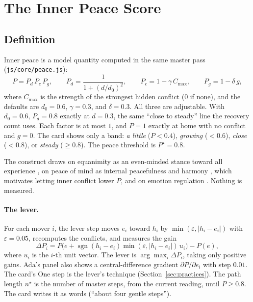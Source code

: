 \documentclass[10pt]{article}
\theoremstyle{definition}
\theoremstyle{remark}
\begin{document}
\section{The Inner Peace Score}
\label{sec:peace}
\subsection{Definition}
Inner peace is a model quantity computed in the same master pass (\texttt{js/core/peace.js}):
\begin{equation}
P = P_d\,P_c\,P_g,\qquad
P_d = \frac{1}{1+(d/d_0)^2},\qquad
P_c = 1-\gamma\,C_{\max},\qquad
P_g = 1-\delta\,g,
\label{eq:P}
\end{equation}
where $C_{\max}$ is the strength of the strongest hidden conflict ($0$ if none), and the defaults are $d_0=0.6$, $\gamma=0.3$, and $\delta=0.3$. All three are adjustable. With $d_0=0.6$, $P_d=0.8$ exactly at $d=0.3$, the same ``close to steady'' line the recovery count uses. Each factor is at most $1$, and $P=1$ exactly at home with no conflict and $g=0$. The card shows only a band: \emph{a little} ($P<0.4$), \emph{growing} ($<0.6$), \emph{close} ($<0.8$), or \emph{steady} ($\ge0.8$). The peace threshold is $P^\star=0.8$.

The construct draws on equanimity as an even-minded stance toward all experience \citep{desbordes2015,kabatzinn2003}, on peace of mind as internal peacefulness and harmony \citep{lee2013}, which motivates letting inner conflict lower $P$, and on emotion regulation \citep{gross1998}. Nothing is measured.

\paragraph{The lever.} For each mover $i$, the lever step moves $e_i$ toward $h_i$ by $\min(\varepsilon,|h_i-e_i|)$ with $\varepsilon=0.05$, recomputes the conflicts, and measures the gain
\begin{equation}
\Delta P_i = P\bigl(e + \operatorname{sgn}(h_i-e_i)\min(\varepsilon,|h_i-e_i|)\,u_i\bigr) - P(e),
\end{equation}
where $u_i$ is the $i$-th unit vector. The lever is $\arg\max_i \Delta P_i$, taking only positive gains. Ada's panel also shows a central-difference gradient $\partial P/\partial e_i$ with step $0.01$. The card's One step is the lever's technique (Section~\ref{sec:practices}). The path length $n^\star$ is the number of master steps, from the current reading, until $P\ge0.8$. The card writes it as words (``about four gentle steps'').
\end{document}
